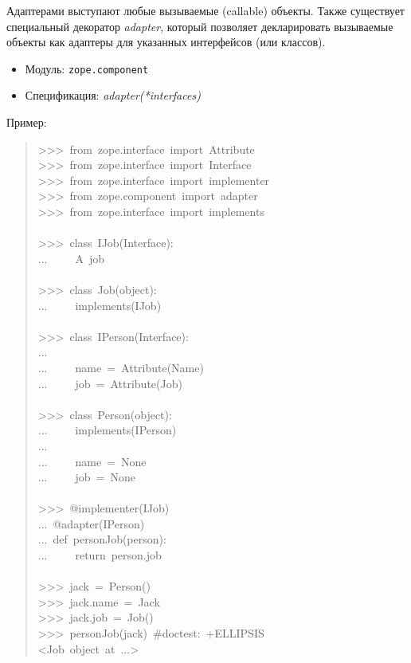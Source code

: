\documentclass[a4paper,openany,twoside,final]{book}
\providecommand*{\DUroletitlereference}[1]{\textsl{#1}}
\begin{document}
Адаптерами выступают любые вызываемые (callable) объекты.  Также
существует специальный декоратор \DUroletitlereference{adapter}, который позволяет
декларировать вызываемые объекты как адаптеры для указанных
интерфейсов (или классов).

\begin{itemize}

\item Модуль: \texttt{zope.component}

\item Спецификация: \DUroletitlereference{adapter(*interfaces)}

\end{itemize}

Пример:

\begin{quote}{\ttfamily \raggedright \noindent
>{}>{}>~from~zope.interface~import~Attribute\\
>{}>{}>~from~zope.interface~import~Interface\\
>{}>{}>~from~zope.interface~import~implementer\\
>{}>{}>~from~zope.component~import~adapter\\
>{}>{}>~from~zope.interface~import~implements\\
~\\
>{}>{}>~class~IJob(Interface):\\
...~~~~~\textquotedbl{}\textquotedbl{}\textquotedbl{}A~job\textquotedbl{}\textquotedbl{}\textquotedbl{}\\
~\\
>{}>{}>~class~Job(object):\\
...~~~~~implements(IJob)\\
~\\
>{}>{}>~class~IPerson(Interface):\\
...\\
...~~~~~name~=~Attribute(\textquotedbl{}Name\textquotedbl{})\\
...~~~~~job~=~Attribute(\textquotedbl{}Job\textquotedbl{})\\
~\\
>{}>{}>~class~Person(object):\\
...~~~~~implements(IPerson)\\
...\\
...~~~~~name~=~None\\
...~~~~~job~=~None\\
~\\
>{}>{}>~@implementer(IJob)\\
...~@adapter(IPerson)\\
...~def~personJob(person):\\
...~~~~~return~person.job\\
~\\
>{}>{}>~jack~=~Person()\\
>{}>{}>~jack.name~=~\textquotedbl{}Jack\textquotedbl{}\\
>{}>{}>~jack.job~=~Job()\\
>{}>{}>~personJob(jack)~\#doctest:~+ELLIPSIS\\
<Job~object~at~...>
}
\end{quote}
\end{document}
